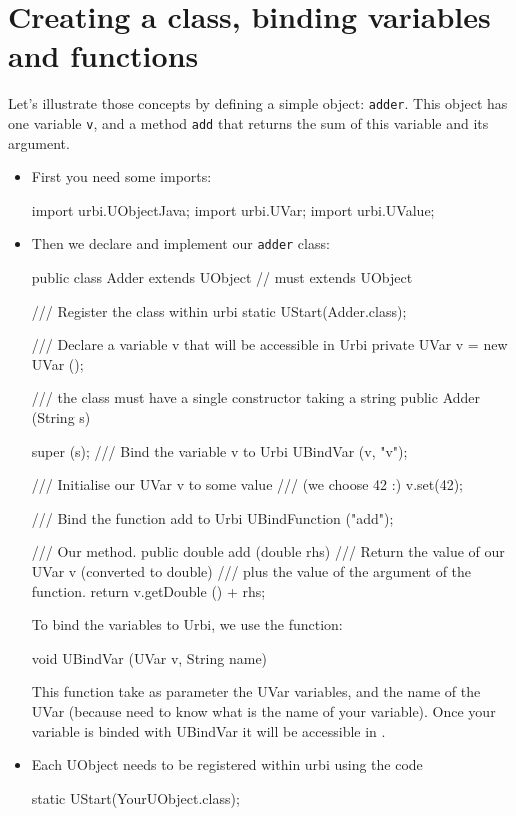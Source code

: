 \section{Creating a class, binding variables and functions}
\label{sec:uob:apijava:bind}

Let's illustrate those concepts by defining a simple object:
\lstinline{adder}. This object has one variable \lstinline{v}, and a
method \lstinline{add} that returns the sum of this variable and its
argument.

\begin{itemize}
\item First you need some imports:

\begin{cxx}
import urbi.UObjectJava;
import urbi.UVar;
import urbi.UValue;
\end{cxx}

\item Then we declare and implement our \lstinline{adder} class:
\begin{cxx}
public class Adder extends UObject // must extends UObject
{
    /// Register the class within urbi
    static { UStart(Adder.class); }

    /// Declare a variable v that will be accessible in Urbi
    private UVar v = new UVar ();

    /// the class must have a single constructor taking a string
    public Adder (String s) {

    	super (s);
    	/// Bind the variable v to Urbi
    	UBindVar (v, "v");

    	/// Initialise our UVar v to some value
    	/// (we choose 42 :)
    	v.set(42);

    	/// Bind the function add to Urbi
    	UBindFunction ("add");
    }

    /// Our method.
    public double add (double rhs) {
    	/// Return the value of our UVar v (converted to double)
    	/// plus the value of the argument of the function.
    	return v.getDouble () + rhs;
    }
}
\end{cxx}

To bind the variables to Urbi, we use the function:
\begin{cxx}
void UBindVar (UVar v, String name)
\end{cxx}

This function take as parameter the UVar variables, and the name of the
UVar (because \urbi need to know what is the name of your variable).
Once your variable is binded with UBindVar it will be accessible in \urbi.

\item Each UObject needs to be registered within urbi using the code
\begin{cxx}
static { UStart(YourUObject.class); }
\end{cxx}
\end{itemize}

